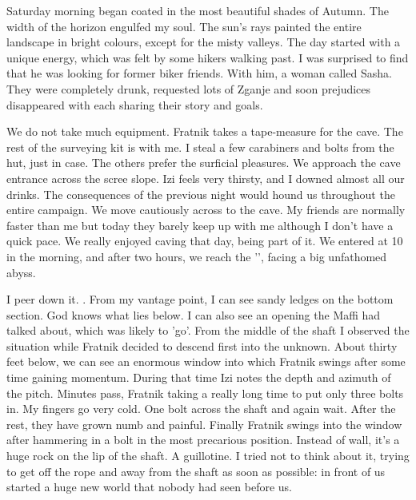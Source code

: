 Saturday morning began coated in the most beautiful shades of Autumn. The width of the horizon engulfed my soul. The sun's rays painted the entire landscape in bright colours, except for the misty valleys. The day started with a unique energy, which was felt by some hikers walking past. I was surprised to find that he was looking for former biker friends. With him, a woman called Sasha. They were completely drunk, requested lots of Zganje and soon prejudices disappeared with each sharing their story and goals.

We do not take much equipment. Fratnik takes a tape-measure for the cave. The rest of the surveying kit is with me. I steal a few carabiners and bolts from the hut, just in case. The others prefer the surficial pleasures. We approach the cave entrance across the scree slope. Izi feels very thirsty, and I downed almost all our drinks. The consequences of the previous night would hound us throughout the entire campaign. We move cautiously across to the cave.  My friends are normally faster than me but today they barely keep up with me although I don't have a quick pace. We really enjoyed caving that day, being part of it. We entered  at 10 in the morning, and after two hours, we reach the '', facing a big unfathomed abyss.

 I peer down it. . From my vantage point, I can see sandy ledges on the bottom section. God knows what lies below. I can also see an opening the Maffi had talked about, which was likely to 'go'. From the middle of the shaft I observed the situation while Fratnik decided to descend first into the unknown. About thirty feet below, we can see an enormous window into which Fratnik swings after some time gaining momentum. During that time Izi notes the depth and azimuth of the pitch. Minutes pass, Fratnik taking a really long time to put only three bolts in. My fingers go very cold. One bolt across the shaft and again wait. After the rest, they have grown numb and painful. Finally Fratnik swings into the window after hammering in a bolt in the most precarious position. Instead of wall, it's a huge rock on the lip of the shaft. A guillotine.  I tried not to think about it, trying to get off the rope and away from the shaft as soon as possible: in front of us started a huge new world that nobody had seen before us. 

